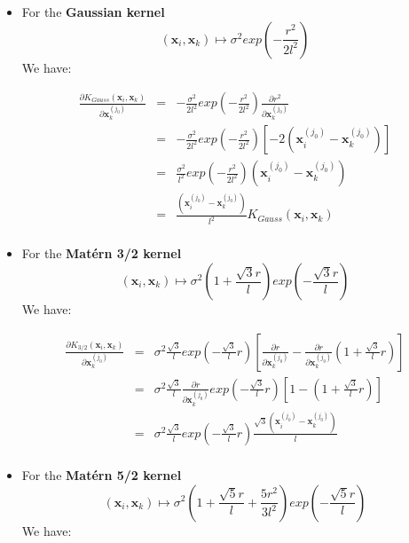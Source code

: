 \begin{itemize}

\item For the \textbf{Gaussian kernel} 
$$
(\textbf{x}_i, \textbf{x}_k) \mapsto \sigma^2 exp \left( -\frac{r^2}{2l^2} \right)
$$ 
We have:

\begin{eqnarray*}
\frac{\partial K_{Gauss}(\textbf{x}_i, \textbf{x}_k)}{\partial \textbf{x}_k^{(j_0)}} &=& -\frac{\sigma^2}{2l^2} exp \left(-\frac{r^2}{2l^2} \right) \frac{\partial r^2}{\partial \textbf{x}_k^{(j_0)}}\\
&=& -\frac{\sigma^2}{2l^2} exp \left(-\frac{r^2}{2l^2} \right) \left[ -2\left(\textbf{x}_i^{(j_0)} - \textbf{x}_k^{(j_0)} \right) \right]\\
&=& \frac{\sigma^2}{l^2} exp \left(-\frac{r^2}{2l^2} \right) \left(\textbf{x}_i^{(j_0)} - \textbf{x}_k^{(j_0)} \right) \\
&=& \frac{\left(\textbf{x}_i^{(j_0)} - \textbf{x}_k^{(j_0)} \right)}{l^2} K_{Gauss}(\textbf{x}_i, \textbf{x}_k)\\
\end{eqnarray*}

\item For the \textbf{Mat\'ern 3/2 kernel} 
$$
(\textbf{x}_i, \textbf{x}_k) \mapsto \sigma^2 \left( 1 + \frac{\sqrt{3}r}{l} \right) exp \left( - \frac{\sqrt{3}r}{l} \right)
$$ 
We have:

\begin{eqnarray*}
\frac{\partial K_{3/2}(\textbf{x}_i, \textbf{x}_k)}{\partial \textbf{x}_k^{(j_0)}} &=& \sigma^2 \frac{\sqrt{3}}{l} exp \left( - \frac{\sqrt{3}}{l} r\right) \left[   \frac{\partial r}{\partial \textbf{x}_k^{(j_0)}}  - \frac{\partial r}{\partial \textbf{x}_k^{(j_0)}} \left( 1 + \frac{\sqrt{3}}{l}r \right) \right]\\
&=&  \sigma^2 \frac{\sqrt{3}}{l} \frac{\partial r}{\partial \textbf{x}_k^{(j_0)}} exp \left( - \frac{\sqrt{3}}{l} r\right) \left[1  -  \left( 1 + \frac{\sqrt{3}}{l}r \right) \right]\\
&=& \sigma^2 \frac{\sqrt{3}}{l} exp \left( - \frac{\sqrt{3}}{l} r\right) \frac{\sqrt{3}\left(\textbf{x}_i^{(j_0)} - \textbf{x}_k^{(j_0)} \right)}{l} \\
\end{eqnarray*}

\item For the \textbf{Mat\'ern 5/2 kernel} 
$$
(\textbf{x}_i, \textbf{x}_k) \mapsto \sigma^2 \left( 1 + \frac{\sqrt{5}r}{l} + \frac{5 r^2}{3 l^2} \right) exp \left( - \frac{\sqrt{5}r}{l} \right)
$$
We have:


\end{itemize}
